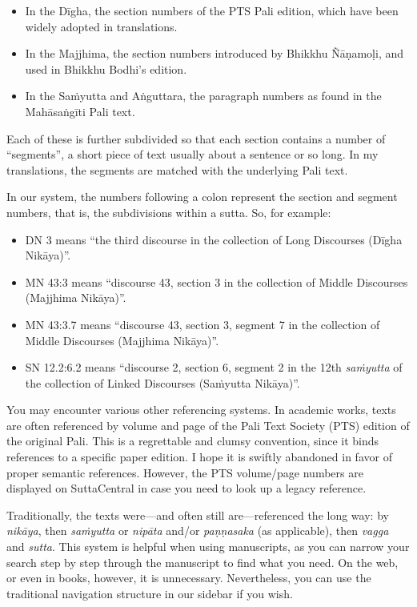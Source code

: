 \documentclass[12pt,openany]{book}%
\begin{document}
\begin{itemize}%
\item In the \textsanskrit{Dīgha}, the section numbers of the PTS Pali edition, which have been widely adopted in translations.%
\item In the Majjhima, the section numbers introduced by Bhikkhu \textsanskrit{Ñāṇamoḷi}, and used in Bhikkhu Bodhi’s edition.%
\item In the \textsanskrit{Saṁyutta} and \textsanskrit{Aṅguttara}, the paragraph numbers as found in the \textsanskrit{Mahāsaṅgīti} Pali text.%
\end{itemize}

Each of these is further subdivided so that each section contains a number of “segments”, a short piece of text usually about a sentence or so long. In my translations, the segments are matched with the underlying Pali text.

In our system, the numbers following a colon represent the section and segment numbers, that is, the subdivisions within a sutta. So, for example:

\begin{itemize}%
\item DN 3 means “the third discourse in the collection of Long Discourses (\textsanskrit{Dīgha} \textsanskrit{Nikāya})”.%
\item MN 43:3 means “discourse 43, section 3 in the collection of Middle Discourses (Majjhima \textsanskrit{Nikāya})”.%
\item MN 43:3.7 means “discourse 43, section 3, segment 7 in the collection of Middle Discourses (Majjhima \textsanskrit{Nikāya})”.%
\item SN 12.2:6.2 means “discourse 2, section 6, segment 2 in the 12th \textit{\textsanskrit{saṁyutta}} of the collection of Linked Discourses (\textsanskrit{Saṁyutta} \textsanskrit{Nikāya})”.%
\end{itemize}

You may encounter various other referencing systems. In academic works, texts are often referenced by volume and page of the Pali Text Society (PTS) edition of the original Pali. This is a regrettable and clumsy convention, since it binds references to a specific paper edition. I hope it is swiftly abandoned in favor of proper semantic references. However, the PTS volume/page numbers are displayed on SuttaCentral in case you need to look up a legacy reference.

Traditionally, the texts were—and often still are—referenced the long way: by \textit{\textsanskrit{nikāya}}, then \textit{\textsanskrit{saṁyutta}} or \textit{\textsanskrit{nipāta}} and/or \textit{\textsanskrit{paṇṇasaka}} (as applicable), then \textit{vagga} and \textit{sutta}. This system is helpful when using manuscripts, as you can narrow your search step by step through the manuscript to find what you need. On the web, or even in books, however, it is unnecessary. Nevertheless, you can use the traditional navigation structure in our sidebar if you wish.
\end{document}
